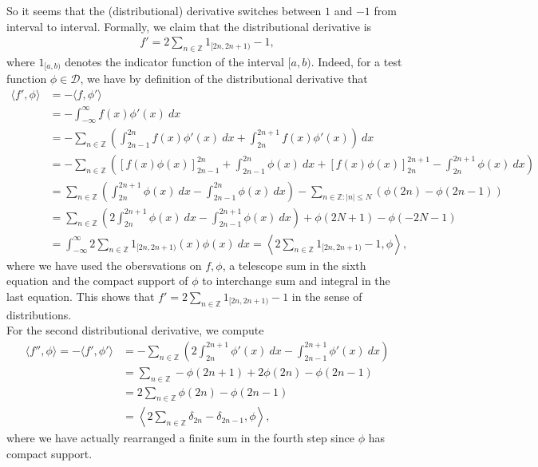\documentclass[11pt]{article}
\begin{document}
\begin{solution}
    So it seems that the (distributional) derivative switches between $1$ and $-1$ from interval to interval. 
	Formally, we claim that the distributional derivative is 
	\begin{align*}
		f' = 2 \sum_{n \in \mathbb{Z}} 1_{[2n, 2n + 1)} - 1
		,
    \end{align*}
    where $1_{[a,b)}$ denotes the indicator function of the interval $[a,b)$.
	Indeed, for a test function $\phi \in \mathcal{D}$, we have by definition of the distributional derivative that
    \begin{align*}
        \langle f', \phi \rangle 
		&
		= 
		- \langle f, \phi' \rangle 
		\\&
		= 
		- \int_{-\infty}^{\infty} f(x) \phi'(x) \ dx 
		\\&
		= 
		- \sum_{n \in \mathbb{Z}} \left ( \int_{2n - 1}^{2n} f(x) \phi'(x) \ dx + \int_{2n}^{2n + 1} f(x) \phi'(x)  \right)\ dx 
		\\&
		= 
		- \sum_{n \in \mathbb{Z}} \left( [f(x) \phi(x)]_{2n - 1}^{2n} + \int_{2n - 1}^{2n} \phi(x) \ dx + [f(x) \phi(x)]_{2n}^{2n+1} - \int_{2n}^{2n + 1} \phi(x)  \ dx \right) 
		\\
        &
		= 
		\sum_{n \in \mathbb{Z}} \left( \int_{2n}^{2n + 1} \phi(x) \ dx - \int_{2n - 1}^{2n} \phi(x) \ dx \right) - \sum_{n \in \mathbb{Z}: |n| \leq N} \left( \phi(2n) - \phi(2n - 1) \right) 
		\\
        & 
		= \sum_{n \in \mathbb{Z}} \left( 2\int_{2n}^{2n + 1} \phi(x) \ dx - \int_{2n - 1}^{2n+1} \phi(x) \ dx \right) + \phi(2N + 1)  - \phi(-2N -1) 
		\\
        & 
		= 
		\int_{-\infty}^{\infty} 2 \sum_{n \in \mathbb{Z}} 1_{[2n, 2n + 1)}(x) \phi(x) \ dx  
		= 
		\left\langle 2 \sum_{n \in \mathbb{Z}} 1_{[2n, 2n + 1)} - 1, \phi \right\rangle
		,
    \end{align*}
    where we have used the obersvations on $f, \phi$, a telescope sum in the sixth equation and the compact support of $\phi$ to interchange sum and integral in the last equation. This shows that $f' = 2 \sum_{n \in \mathbb{Z}} 1_{[2n, 2n + 1)} - 1$ in the sense of distributions.
	\\

    For the second distributional derivative, we compute
    \begin{align}
        \langle f'', \phi \rangle 
		= 
		- \langle f', \phi' \rangle 
        &
		= 
		-\sum_{n \in \mathbb{Z}} \left( 2 \int_{2n}^{2n + 1} \phi'(x) \ dx  - \int_{2n - 1}^{2n + 1} \phi'(x) \ dx \right) 
		\\&
		= 
		\sum_{n \in \mathbb{Z}} - \phi(2 n + 1) +  2\phi(2n) - \phi(2n-1) 
		\\& 
		= 2 \sum_{n \in \mathbb{Z}} \phi(2n) - \phi(2n - 1)
		\\& 
		= 
		\left \langle 2 \sum_{n \in \mathbb{Z}} \delta_{2n}  - \delta_{2n - 1}, \phi \right \rangle
		,
    \end{align}
    where we have actually rearranged a finite sum in the fourth step since $\phi$ has compact support.
	

\end{solution}
\end{document}

